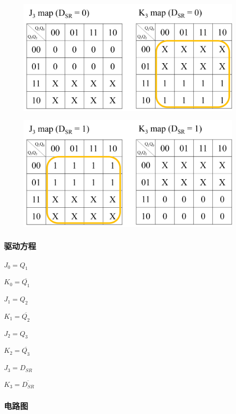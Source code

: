\documentclass{article}
\begin{document}
\begin{figure}[!hbp]
  \centering
  \includegraphics[scale=0.5]{3/k4.png}
\end{figure}

\newpage

\begin{figure}[!hbp]
  \centering
  \includegraphics[scale=0.5]{3/k5.png}
\end{figure}

\subsubsection{驱动方程}

$J_0 = Q_1$

$K_0 = \overline{Q_1}$

$J_1 = Q_2$

$K_1 = \overline{Q_2}$

$J_2 = Q_3$

$K_2 = \overline{Q_3}$

$J_3 = D_{SR}$

$K_3 = \overline{D_{SR}}$

\subsubsection{电路图}
\end{document}
